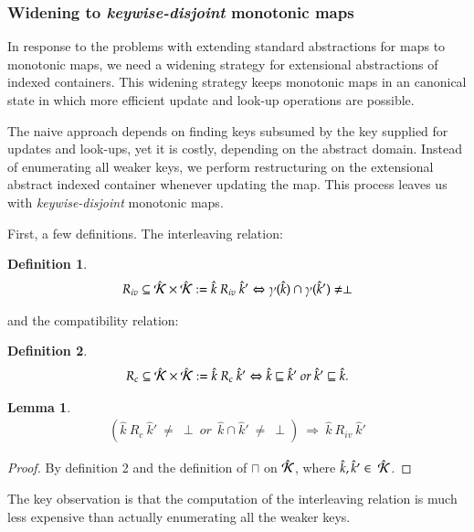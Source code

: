 \documentclass[preprint,9pt]{sigplanconf} %
\newtheorem{mdef}{Definition}
\newtheorem{mlem}{Lemma}
\begin{document}
\subsubsection{Widening to \emph{keywise-disjoint} monotonic maps}
In response to the problems with extending standard abstractions for
maps to monotonic maps, we need a widening strategy for extensional
abstractions of indexed containers. This widening strategy keeps
monotonic maps in an canonical state in which more efficient update
and look-up operations are possible.

The naive approach depends on finding keys subsumed by the key
supplied for updates and look-ups, yet it is costly, depending on the
abstract domain. Instead of enumerating all weaker keys, we perform
restructuring on the extensional abstract indexed container whenever
updating the map. This process leaves us with \emph{keywise-disjoint}
monotonic maps.

First, a few definitions. The interleaving relation:

\begin{mdef}
\begin{align*}
R_{iv} \subseteq \hat{\mathcal{K}} \times \hat{\mathcal{K}} := \hat k\ R_{iv}\ \hat
k' \Leftrightarrow  \gamma(\hat k) \cap \gamma(\hat k') \neq \perp
\end{align*}
\end{mdef}

and the compatibility relation:

\begin{mdef}
\begin{align*}
R_{c} \subseteq \hat{\mathcal{K}} \times \hat{\mathcal{K}} := \hat k\ R_{c}\ \hat
k' \Leftrightarrow \hat k \sqsubseteq \hat k'\ or\ \hat k' \sqsubseteq
\hat k.
\end{align*}
\end{mdef}

\begin{mlem}
\begin{align*}
(\hat k\ R_c\ \hat k'\ \neq\ \perp\ or\ \ \hat k \cap \hat
k'\ \neq\ \perp)\ \Rightarrow\ \hat k\ R_{iv}\ \hat k'
\end{align*}
\end{mlem}

\begin{proof}
By definition 2 and the definition of $\sqcap$ on
$\hat{\mathcal{K}}$, where $\hat k,\hat k' \in\ \hat{\mathcal{K}}$.
\end{proof}

The key observation is that the computation of the interleaving
relation is much less expensive than actually enumerating all the
weaker keys.
\end{document}
